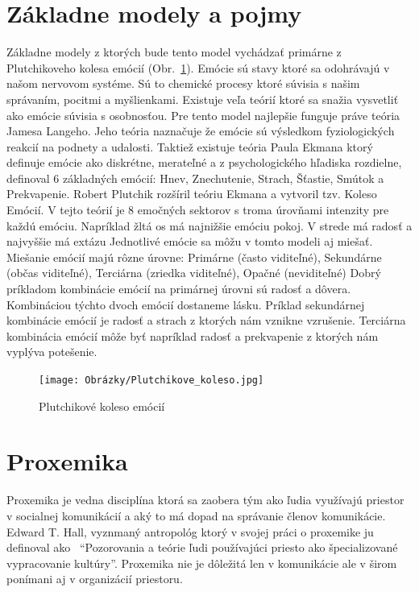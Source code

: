 \documentclass[10pt,oneside,slovak,a4paper]{article}
\begin{document}
\section{Základne modely a pojmy}\label{zaklad}

Základne modely z ktorých bude tento model vychádzať primárne z Plutchikoveho kolesa emócií
(Obr.~\ref{fig:EWheel}). Emócie sú stavy ktoré sa odohrávajú v našom nervovom systéme. Sú to chemické
procesy ktoré súvisia s našim správaním, pocitmi a myšlienkami. Existuje veľa teórií ktoré sa snažia
vysvetliť ako emócie súvisia s osobnosťou. Pre tento model najlepšie funguje práve teória Jamesa
Langeho. Jeho teória naznačuje že emócie sú výsledkom fyziologických reakcií na podnety a udalosti.
Taktiež existuje teória Paula Ekmana ktorý definuje emócie ako diskrétne, merateľné a z psychologického
hľadiska rozdielne, definoval 6 základných emócií: Hnev, Znechutenie, Strach, Šťastie, Smútok a
Prekvapenie. Robert Plutchik rozšíril teóriu Ekmana a vytvoril tzv. Koleso Emócií. V tejto teórií je 8
emočných sektorov s troma úrovňami intenzity pre každú emóciu. Napríklad žltá os má najnižšie
emóciu pokoj. V strede má radosť a najvyššie má extázu Jednotlivé emócie sa môžu v tomto modeli
aj miešať. Miešanie emócií majú rôzne úrovne: Primárne (často viditeľné), Sekundárne (občas viditeľné),
Terciárna (zriedka viditeľné), Opačné (neviditeľné) Dobrý príkladom kombinácie emócií na primárnej 
úrovni sú radosť a dôvera. Kombináciou týchto dvoch emócií dostaneme lásku. Príklad sekundárnej
kombinácie emócií je radosť a strach z ktorých nám vznikne vzrušenie. Terciárna kombinácia
emócií môže byť napríklad radosť a prekvapenie z ktorých nám vyplýva potešenie.

\begin{figure}[H]
		\centering
		\texttt{[image: Obrázky/Plutchikove\_koleso.jpg]}
		\caption{Plutchikové koleso emócií~\cite{emocie}}
		\label{fig:EWheel}
\end{figure}

\section{Proxemika}\label{proxemika}

Proxemika je vedna disciplína ktorá sa zaobera tým ako ľudia využívajú priestor v
socialnej komunikácií a aký to má dopad na správanie členov komunikácie. Edward T. Hall,
vyznmaný antropológ ktorý v svojej práci o proxemike ju definoval ako~\cite{proxemics} ``Pozorovania a teórie
ľudi používajúci priesto ako špecializované vypracovanie kultúry''. Proxemika nie je dôležitá
len v komunikácie ale v širom ponímani aj v organizácií priestoru.
\end{document}
